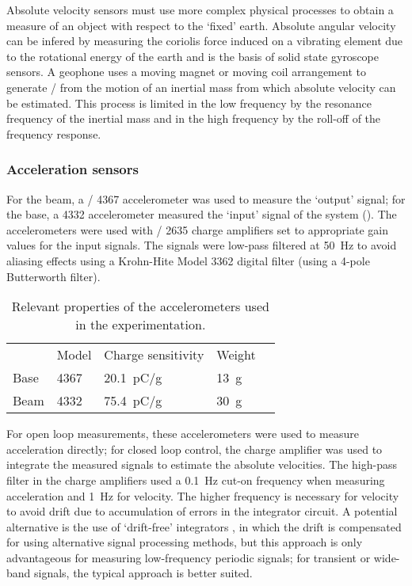 \documentclass[11pt,a4paper]{memoir}
\begin{document}
Absolute velocity sensors must use more complex physical processes to obtain a measure of an object with respect to the `fixed' earth.
Absolute angular velocity can be infered by measuring the coriolis force induced on a vibrating element due to the rotational energy of the earth \cite{konno1996} and is the basis of solid state gyroscope sensors.
A geophone uses a moving magnet or moving coil arrangement to generate \backemf/ from the motion of an inertial mass \cite{oome2009-saa} from which absolute velocity can be estimated.
This process is limited in the low frequency by the resonance frequency of the inertial mass and in the high frequency by the roll-off of the frequency response.

\subsubsection{Acceleration sensors}

For the beam, a \BnK/ 4367 accelerometer was used to measure the `output' signal; for the base, a 4332 accelerometer measured the `input' signal of the system ().
The accelerometers were used with \BnK/ 2635 charge amplifiers set to appropriate gain values for the input signals.
The signals were low-pass filtered at \SI{50}{Hz} to avoid aliasing effects using a Krohn-Hite Model 3362 digital filter (using a 4-pole Butterworth filter).

\begin{table}
  \caption{Relevant properties of the accelerometers used in the experimentation.}
  \begin{tabular}{@{}lllll@{}}
    \toprule
           & Model & Charge sensitivity & Weight \\
    \cmidrule{2-4}
      Base & 4367 & \SI{20.1}{pC/g} & \SI{13}{g} \\
      Beam & 4332 & \SI{75.4}{pC/g} & \SI{30}{g} \\
    \bottomrule
  \end{tabular}
\end{table}

For open loop measurements, these accelerometers were used to measure acceleration directly; for closed loop control, the charge amplifier was used to integrate the measured signals to estimate the absolute velocities.
The high-pass filter in the charge amplifiers used a \SI{0.1}{Hz} cut-on frequency when measuring acceleration and \SI{1}{Hz} for velocity.
The higher frequency is necessary for velocity to avoid drift due to accumulation of errors in the integrator circuit.
A potential alternative is the use of `drift-free' integrators \cite{gavin1998}, in which the drift is compensated for using alternative signal processing methods, but this approach is only advantageous for measuring low-frequency periodic signals; for transient or wide-band signals, the typical approach is better suited.
\end{document}
